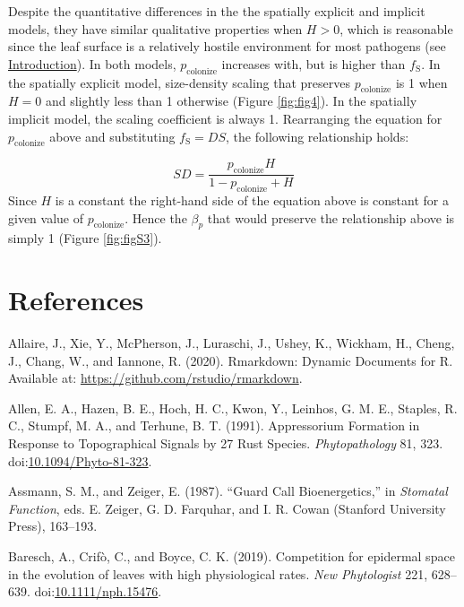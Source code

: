 \documentclass[utf8]{frontiersSCNS}
\newcommand{\fs}{$f_\text{S}$}
\begin{document}
Despite the quantitative differences in the the spatially explicit and
implicit models, they have similar qualitative properties when
\(H > 0\), which is reasonable since the leaf surface is a relatively
hostile environment for most pathogens (see
\protect\hyperlink{introduction}{Introduction}). In both models,
\(p_\text{colonize}\) increases with, but is higher than \fs. In the
spatially explicit model, size-density scaling that preserves
\(p_\text{colonize}\) is 1 when \(H = 0\) and slightly less than 1
otherwise (Figure \ref{fig:fig4}). In the spatially implicit model, the
scaling coefficient is always 1. Rearranging the equation for
\(p_\text{colonize}\) above and substituting \(f_\text{S} = DS\), the
following relationship holds:

\[SD = \frac{p_\text{colonize} H}{1 - p_\text{colonize} + H}\] Since
\(H\) is a constant the right-hand side of the equation above is
constant for a given value of \(p_\text{colonize}\). Hence the
\(\beta_p\) that would preserve the relationship above is simply 1
(Figure \ref{fig:figS3}).

\clearpage

\hypertarget{references}{%
\section*{References}\label{references}}

\hypertarget{refs}{}
\leavevmode\hypertarget{ref-allaire_rmarkdown:_2020}{}%
Allaire, J., Xie, Y., McPherson, J., Luraschi, J., Ushey, K., Wickham,
H., Cheng, J., Chang, W., and Iannone, R. (2020). Rmarkdown: Dynamic
Documents for R. Available at:
\url{https://github.com/rstudio/rmarkdown}.

\leavevmode\hypertarget{ref-allen_appressorium_1991}{}%
Allen, E. A., Hazen, B. E., Hoch, H. C., Kwon, Y., Leinhos, G. M. E.,
Staples, R. C., Stumpf, M. A., and Terhune, B. T. (1991). Appressorium
Formation in Response to Topographical Signals by 27 Rust Species.
\emph{Phytopathology} 81, 323.
doi:\href{https://doi.org/10.1094/Phyto-81-323}{10.1094/Phyto-81-323}.

\leavevmode\hypertarget{ref-assmann_guard_1987}{}%
Assmann, S. M., and Zeiger, E. (1987). ``Guard Call Bioenergetics,'' in
\emph{Stomatal Function}, eds. E. Zeiger, G. D. Farquhar, and I. R.
Cowan (Stanford University Press), 163--193.

\leavevmode\hypertarget{ref-baresch_competition_2019}{}%
Baresch, A., Crifò, C., and Boyce, C. K. (2019). Competition for
epidermal space in the evolution of leaves with high physiological
rates. \emph{New Phytologist} 221, 628--639.
doi:\href{https://doi.org/10.1111/nph.15476}{10.1111/nph.15476}.
\end{document}
